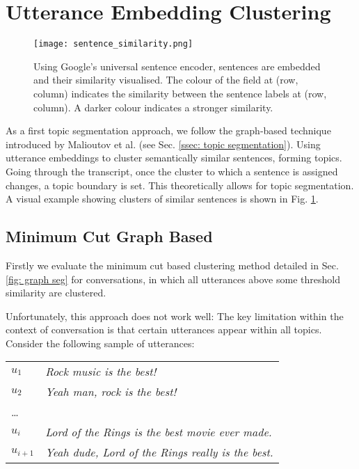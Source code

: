 \section[Clustering]{Utterance Embedding Clustering \label{method: utterance embedding clustering}}
    \begin{figure}[t]
        \centering
        \texttt{[image: sentence\_similarity.png]}
        \caption{Using Google's universal sentence encoder, sentences are embedded and their similarity visualised. The colour of the field at (row, column) indicates the similarity between the sentence labels at (row, column). A darker colour indicates a stronger similarity.}
        \label{fig:sentence similarity}
    \end{figure}
    As a first topic segmentation approach, we follow the graph-based technique introduced by Malioutov et al.\cite{malioutov2006minimum} (see Sec. \ref{ssec: topic segmentation}). Using \gls{utterance} \glspl{embedding} to cluster semantically similar sentences, forming topics. Going through the transcript, once the cluster to which a sentence is assigned changes, a topic boundary is set. This theoretically allows for topic segmentation. A visual example showing clusters of similar sentences is shown in Fig. \ref{fig:sentence similarity}.

    \subsection{Minimum Cut Graph Based \label{method: minimum cut}}

        Firstly we evaluate the minimum cut based clustering method detailed in Sec. \ref{fig: graph seg} for conversations, in which all \glspl{utterance} above some threshold similarity are clustered.
        
        Unfortunately, this approach does not work well: The key limitation within the context of conversation is that certain \glspl{utterance} appear within all topics. Consider the following sample of \glspl{utterance}:
        \begin{table}[h]
            \begin{tabular}{l|l}
            $u_1$     & \textit{Rock music is the best!}                        \\
            $u_2$     & \textit{Yeah man, rock is the best!}                    \\
            \dots      &                                                         \\
            $u_i$     & \textit{Lord of the Rings is the best movie ever made.} \\
            $u_{i+1}$ & \textit{Yeah dude, Lord of the Rings really is the best.}              \\
            \end{tabular}
        \end{table}

